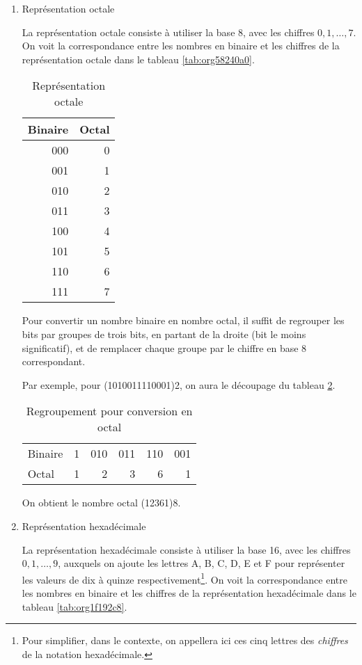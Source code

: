 \documentclass[letter, oneside]{book}
\begin{document}
\begin{enumerate}
\item Représentation octale
\label{sec:orge82bd69}

La représentation octale consiste à utiliser la base 8, avec les
chiffres \(0, 1, \ldots, 7\). On voit la correspondance entre les
nombres en binaire et les chiffres de la représentation octale dans le
tableau \ref{tab:org58240a0}.

\begin{table}[htbp]
\caption{\label{tab:org8be63b8}Représentation octale}
\centering
\begin{tabular}{rr}
Binaire & Octal\\[0pt]
\hline
000 & 0\\[0pt]
001 & 1\\[0pt]
010 & 2\\[0pt]
011 & 3\\[0pt]
100 & 4\\[0pt]
101 & 5\\[0pt]
110 & 6\\[0pt]
111 & 7\\[0pt]
\end{tabular}
\end{table}

Pour convertir un nombre binaire en nombre octal, il suffit de
regrouper les bits par groupes de trois bits, en partant de la droite
(bit le moins significatif), et de remplacer chaque groupe par le
chiffre en base 8 correspondant.

Par exemple, pour (1010011110001)2, on aura le découpage du tableau
\ref{tab:orgfea66ed}.

\begin{table}[htbp]
\caption{\label{tab:orgfea66ed}Regroupement pour conversion en octal}
\centering
\begin{tabular}{lrrrrr}
 &  &  &  &  & \\[0pt]
\hline
Binaire & 1 & 010 & 011 & 110 & 001\\[0pt]
Octal & 1 & 2 & 3 & 6 & 1\\[0pt]
\end{tabular}
\end{table}

On obtient le nombre octal (12361)8.

\item Représentation hexadécimale
\label{sec:org8da09cd}

La représentation hexadécimale consiste à utiliser la base 16, avec
les chiffres \(0, 1, \ldots, 9\), auxquels on ajoute les lettres A, B,
C, D, E et F pour représenter les valeurs de dix à quinze
respectivement\footnote{Pour simplifier, dans le contexte, on appellera ici ces cinq
lettres des \emph{chiffres} de la notation hexadécimale.}. On voit la correspondance entre les nombres en binaire et les chiffres de la représentation hexadécimale dans le tableau \ref{tab:org1f192c8}.


\end{enumerate}
\end{document}

